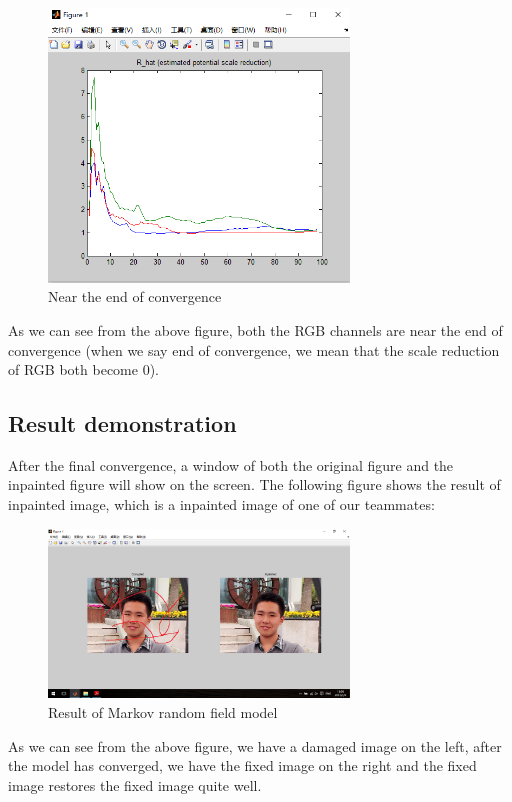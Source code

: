 \begin{figure}[H]
\centering
\includegraphics[width=8cm]{mrf_cov.png}
\caption{Near the end of convergence}
\end{figure}

As we can see from the above figure, both the RGB channels are near the end of convergence (when we say end of convergence, we mean that the scale reduction of RGB both become 0).

\subsection{Result demonstration}
After the final convergence, a window of both the original figure and the inpainted figure will show on the screen. The following figure shows the result of inpainted image, which is a inpainted image of one of our teammates:

\begin{figure}[H]
\centering
\includegraphics[width=8cm]{mrf_res.png}
\caption{Result of Markov random field model}
\end{figure}

As we can see from the above figure, we have a damaged image on the left, after the model has converged, we have the fixed image on the right and the fixed image restores the fixed image quite well.


\newpage

